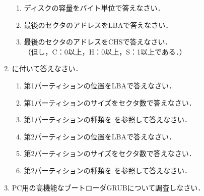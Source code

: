 \begin{enumerate}
\begin{enumerate}
  \item ディスクの容量をバイト単位で答えなさい．
  \item 最後のセクタのアドレスをLBAで答えなさい．
  \item 最後のセクタのアドレスをCHSで答えなさい．\\
    （但し，C：0以上，H：0以上，S：1以上である．）
  \end{enumerate}
\item {}に付いて答えなさい．
  \begin{enumerate}
  \item 第1パーティションの位置をLBAで答えなさい．
  \item 第1パーティションのサイズをセクタ数で答えなさい．
  \item 第1パーティションの種類を
    を参照して答えなさい．
  \item 第2パーティションの位置をLBAで答えなさい．
  \item 第2パーティションのサイズをセクタ数で答えなさい．
  \item 第2パーティションの種類を
    を参照して答えなさい．
  \end{enumerate}
\item PC用の高機能なブートローダGRUBについて調査しなさい．
\end{enumerate}
